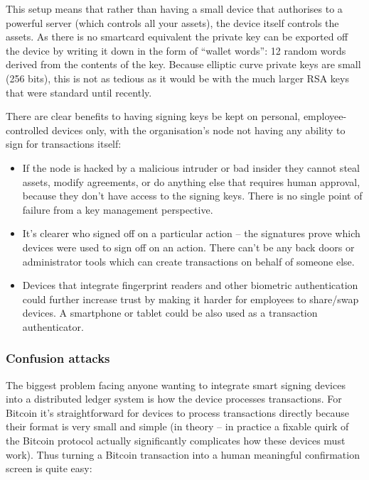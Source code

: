 \documentclass{article}
\begin{document}
This setup means that rather than having a small device that authorises to a powerful server (which controls all
your assets), the device itself controls the assets. As there is no smartcard equivalent the private key can be
exported off the device by writing it down in the form of ``wallet words'': 12 random words derived from the
contents of the key. Because elliptic curve private keys are small (256 bits), this is not as tedious as it would
be with the much larger RSA keys that were standard until recently.

There are clear benefits to having signing keys be kept on personal, employee-controlled devices only, with the
organisation's node not having any ability to sign for transactions itself:

\begin{itemize}
    \item If the node is hacked by a malicious intruder or bad insider they cannot steal assets, modify agreements,
    or do anything else that requires human approval, because they don't have access to the signing keys. There is no single
    point of failure from a key management perspective.
    \item It's clearer who signed off on a particular action -- the signatures prove which devices were used to sign off
    on an action. There can't be any back doors or administrator tools which can create transactions on behalf of someone else.
    \item Devices that integrate fingerprint readers and other biometric authentication could further increase trust by
    making it harder for employees to share/swap devices. A smartphone or tablet could be also used as a transaction authenticator.
\end{itemize}

\subsubsection{Confusion attacks}

The biggest problem facing anyone wanting to integrate smart signing devices into a distributed ledger system is
how the device processes transactions. For Bitcoin it's straightforward for devices to process transactions
directly because their format is very small and simple (in theory -- in practice a fixable quirk of the Bitcoin
protocol actually significantly complicates how these devices must work). Thus turning a Bitcoin transaction into a
human meaningful confirmation screen is quite easy:
\end{document}
